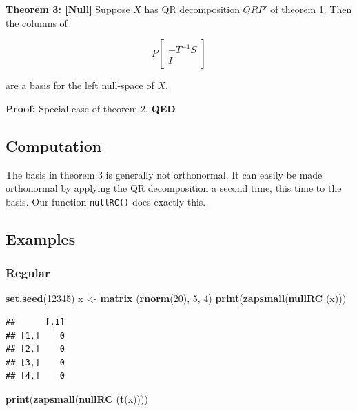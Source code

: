 \documentclass[12pt,]{article}
\newenvironment{Shaded}{\begin{snugshade}}{\end{snugshade}}
\newcommand{\KeywordTok}[1]{\textcolor[rgb]{0.13,0.29,0.53}{\textbf{#1}}}
\newcommand{\DecValTok}[1]{\textcolor[rgb]{0.00,0.00,0.81}{#1}}
\newcommand{\StringTok}[1]{\textcolor[rgb]{0.31,0.60,0.02}{#1}}
\newcommand{\NormalTok}[1]{#1}
\begin{document}
\textbf{Theorem 3: {[}Null{]}} Suppose \(X\) has QR decomposition
\(QRP'\) of theorem 1. Then the columns of

\begin{equation}
P\begin{bmatrix}-T^{-1}S\\I\end{bmatrix}\label{E:null}
\end{equation}

are a basis for the left null-space of \(X\).

\textbf{Proof:} Special case of theorem 2. \textbf{QED}

\subsection{Computation}\label{computation-2}

The basis in theorem 3 is generally not orthonormal. It can easily be
made orthonormal by applying the QR decomposition a second time, this
time to the basis. Our function \texttt{nullRC()} does exactly this.

\subsection{Examples}\label{examples-2}

\subsubsection{Regular}\label{regular-2}

\begin{Shaded}
\begin{Highlighting}[]
\KeywordTok{set.seed}\NormalTok{(}\DecValTok{12345}\NormalTok{)}
\NormalTok{x <-}\StringTok{ }\KeywordTok{matrix}\NormalTok{ (}\KeywordTok{rnorm}\NormalTok{(}\DecValTok{20}\NormalTok{), }\DecValTok{5}\NormalTok{, }\DecValTok{4}\NormalTok{)}
\KeywordTok{print}\NormalTok{(}\KeywordTok{zapsmall}\NormalTok{(}\KeywordTok{nullRC}\NormalTok{ (x)))}
\end{Highlighting}
\end{Shaded}

\begin{verbatim}
##      [,1]
## [1,]    0
## [2,]    0
## [3,]    0
## [4,]    0
\end{verbatim}

\begin{Shaded}
\begin{Highlighting}[]
\KeywordTok{print}\NormalTok{(}\KeywordTok{zapsmall}\NormalTok{(}\KeywordTok{nullRC}\NormalTok{ (}\KeywordTok{t}\NormalTok{(x))))}
\end{Highlighting}
\end{Shaded}
\end{document}
